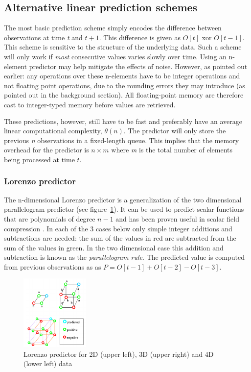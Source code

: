  \subsection{Alternative linear prediction schemes}
  The most basic prediction scheme simply encodes the difference between observations at time \textit{t} and $t+1$. This difference is given as $O[t]$ xor $O[t-1]$. This 
  scheme is sensitive to the structure of the underlying data. Such a scheme will only work if \emph{most} consecutive values varies slowly over time. Using an n-element 
  predictor may help mitigate the effects of noise. However, as pointed out earlier: any operations over these n-elements have to be integer operations and not 
  floating point operations, due to the rounding errors they may introduce (as pointed out in the background section). All floating-point memory are therefore cast to 
  integer-typed memory before values are retrieved.
  
  These predictions, however, still have to be fast and preferably have an average linear computational complexity, $\theta(n)$. The predictor will only 
  store the previous \textit{n} observations in a fixed-length queue. This implies that the memory overhead for the predictor is $n\times m$ where \textit{m} is 
  the total number of elements being processed at time $t$.
 \subsubsection{Lorenzo predictor}
 The n-dimensional Lorenzo predictor is a generalization of the two dimensional parallelogram predictor (see figure~\ref{LORENZO}). It can be used to predict scalar 
 functions that are polynomials of degree $n - 1$ and has been proven useful in scalar field compression \cite{CGF:CGF681}. In each of the 3 cases below only simple
 integer additions and subtractions are needed: the sum of the values in red are subtracted from the sum of the values in green. In the two dimensional case this 
 addition and subtraction is known as the \textit{parallelogram rule}. The predicted value is computed from previous observations as as $P = O[t-1] + O[t-2] - O[t-3]$.
  \begin{figure}[h!]
  \begin{mdframed}
    \centering
    \includegraphics[width=0.3\textwidth]{lorenzo.png}
    \caption{Lorenzo predictor for 2D (upper left), 3D (upper right) and 4D (lower left) data \cite{CGF:CGF681}}
    \label{LORENZO}
  \end{mdframed}
  \end{figure} 
